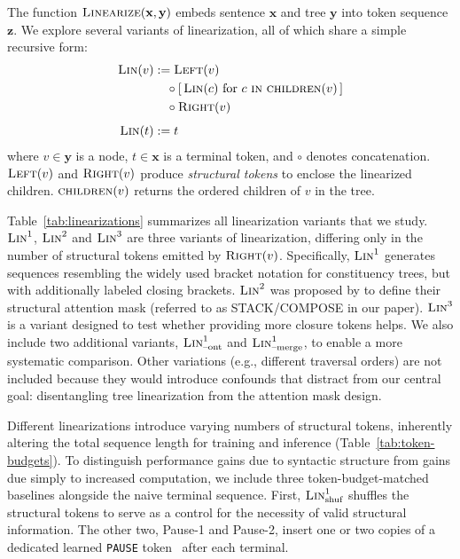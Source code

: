 \documentclass[11pt]{article}
\begin{document}
The function $\textsc{Linearize}(\mathbf{x}, \mathbf{y})$ embeds sentence $\mathbf{x}$ and tree $\mathbf{y}$ into token sequence $\mathbf{z}$. We explore several variants of linearization, all of which share a simple recursive form:
\begin{align}
    \textsc{Lin}(v) &:= \textsc{Left}(v) \notag \\
    &\quad \circ [\, \textsc{Lin}(c) \text{ for } c ~\textsc{in} ~\textsc{children}(v) \,] \notag \\ 
    &\quad \circ \textsc{Right}(v) \\[1ex]
    \textsc{Lin}(t) &:= t
\end{align}
where $v\in \mathbf{y}$ is a node, $t\in\mathbf{x}$ is a terminal token, and $\circ$ denotes concatenation. $\textsc{Left}(v)$ and $\textsc{Right}(v)$ produce \emph{structural tokens} to enclose the linearized children. $\textsc{children}(v)$ returns the ordered children of $v$ in the tree. 

Table~\ref{tab:linearizations} summarizes all linearization variants that we study. $\textsc{Lin}^1$, $\textsc{Lin}^2$ and $\textsc{Lin}^3$ are three variants of linearization, differing only in the number of structural tokens emitted by $\textsc{Right}(v)$. Specifically, $\textsc{Lin}^1$ generates sequences resembling the widely used bracket notation for constituency trees, but with additionally labeled closing brackets. $\textsc{Lin}^2$ was proposed by \citet{sartran-etal-2022-transformer} to define their structural attention mask (referred to as STACK/COMPOSE in our paper). $\textsc{Lin}^3$ is a variant designed to test whether providing more closure tokens helps. We also include two additional variants, $\textsc{Lin}^1_{\text{--ont}}$ and $\textsc{Lin}^1_{\text{--merge}}$, to enable a more systematic comparison. %
Other variations (e.g., different traversal orders) are not included because they would introduce confounds that distract from our central goal: disentangling tree linearization from the attention mask design. %

Different linearizations introduce varying numbers of structural tokens, inherently altering the total sequence length for training and inference (Table~\ref{tab:token-budgets}). %
To distinguish performance gains due to syntactic structure from gains due simply to increased computation, we include three token-budget-matched baselines alongside the naive terminal sequence. First, $\textsc{Lin}^1_{\text{shuf}}$ shuffles the structural tokens to serve as a control for the necessity of valid structural information. The other two, Pause-1 and Pause-2, insert one or two copies of a dedicated learned \texttt{PAUSE} token~\cite{goyal2024think} after each terminal.
\end{document}
